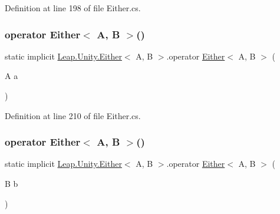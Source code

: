 Definition at line 198 of file Either.\+cs.

\mbox{\label{struct_leap_1_1_unity_1_1_either_aad4cf5d2660fccc66c7fb8af73670645}} 
\subsubsection{\texorpdfstring{operator Either$<$ A, B $>$()}{operator Either< A, B >()}\hspace{0.1cm}{\footnotesize\ttfamily [1/2]}}
{\footnotesize\ttfamily static implicit \mbox{\hyperlink{struct_leap_1_1_unity_1_1_either}{Leap.\+Unity.\+Either}}$<$ A, B $>$.operator \mbox{\hyperlink{struct_leap_1_1_unity_1_1_either}{Either}}$<$ A, B $>$ (\begin{DoxyParamCaption}\item[{A}]{a }\end{DoxyParamCaption})\hspace{0.3cm}{\ttfamily [static]}}



Definition at line 210 of file Either.\+cs.

\mbox{\label{struct_leap_1_1_unity_1_1_either_aad64b8a106656a151294f1e5f9c70aef}} 
\subsubsection{\texorpdfstring{operator Either$<$ A, B $>$()}{operator Either< A, B >()}\hspace{0.1cm}{\footnotesize\ttfamily [2/2]}}
{\footnotesize\ttfamily static implicit \mbox{\hyperlink{struct_leap_1_1_unity_1_1_either}{Leap.\+Unity.\+Either}}$<$ A, B $>$.operator \mbox{\hyperlink{struct_leap_1_1_unity_1_1_either}{Either}}$<$ A, B $>$ (\begin{DoxyParamCaption}\item[{B}]{b }\end{DoxyParamCaption})\hspace{0.3cm}{\ttfamily [static]}}



